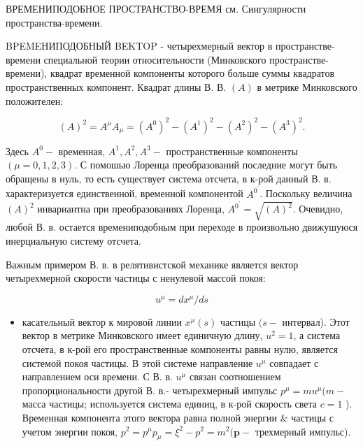 \documentclass[10pt]{article}
\begin{document}
ВРЕМЕНИПОДОБНОЕ ПРОСТРАНСТВО-ВРЕМЯ см. Сингулярности пространства-времени.



BPEMEНИПОДОБНЫЙ BEKTOP - четырехмерный вектор в пространстве-времени специальной теории относительности (Минковского пространстве-времени), квадрат временной компоненты которого больше суммы квадратов пространственных компонент. Квадрат длины В. В. $(A)$ в метрике Минковского положителен:



\[

(A)^{2}=A^{\mu} A_{\mu}=\left(A^{0}\right)^{2}-\left(A^{1}\right)^{2}-\left(A^{2}\right)^{2}-\left(A^{3}\right)^{2} .

\]



Здесь $A^{0}-$ временная, $A^{1}, A^{2}, A^{3}-$ пространственные компоненты $(\mu=0,1,2,3)$. С помошью Лоренца преобразований последние могут быть обращены в нуль, то есть существует система отсчета, в к-рой данный В. в. характеризуется единственной, временной компонентой $A^{0^{\prime}}$. Поскольку величина $(A)^{2}$ инвариантна при преобразованиях Лоренца, $A^{0^{\prime}}=\sqrt{(A)^{2}}$. Очевидно, любой В. в. остается времениподобным при переходе в произвольно движушуюся инерциальную систему отсчета.



Важным примером В. в. в релятивистской механике является вектор четырехмерной скорости частицы с ненулевой массой покоя:



\[

u^{\mu}=d x^{\mu} / d s

\]



\begin{itemize}

  \item касательный вектор к мировой линии $x^{\mu}(s)$ частицы $(s-$ интервал). Этот вектор в метрике Минковского имеет единичную длину, $u^{2}=1$, а система отсчета, в к-рой его пространственные компоненты равны нулю, является системой покоя частицы. В этой системе направление $u^{\mu}$ совпадает с направлением оси времени. С В. в. $u^{\mu}$ связан соотношением пропорциональности другой В. в.- четырехмерный импульс $p^{\mu}=m u^{\mu}(m-$ масса частицы; используется система единиц, в к-рой скорость света $c=1$ ). Временная компонента этого вектора равна полной энергии \& частицы с учетом энергии покоя, $p^{2}=p^{\mu} p_{\mu}=\xi^{2}-p^{2}=m^{2}(\boldsymbol{p}-$ трехмерный импульс).

\end{itemize}
\end{document}
